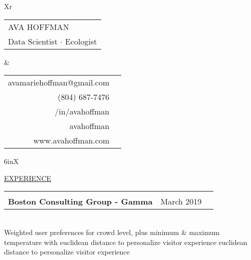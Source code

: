 \documentclass[fontsize=10pt]{scrlttr2}
\begin{document}

\begin{tabularx}{\textwidth}{Xr}
    \begin{tabular}{l}
        \Huge AVA HOFFMAN \\
        \large Data Scientist $\cdot$ Ecologist \\
    \end{tabular}
    & 
    \begin{tabular}{rc}
        \footnotesize avamariehoffman@gmail.com & {\faEnvelopeO} \\
        \footnotesize (804) 687-7476 & {\faMobile} \\
        \footnotesize /in/avahoffman & {\faLinkedin} \\
        \footnotesize avahoffman & {\faGithub} \\
        \footnotesize www.avahoffman.com & {\faGlobe} \\
    \end{tabular}
\end{tabularx}
\vspace{0.5cm}

\newcommand{\experienceboxsize}{6in}

\begin{tabularx}{\experienceboxsize}{X}

    \Large\underline{EXPERIENCE} \\
    
    {\begin{tabularx}{\experienceboxsize}{lXr}
	{\faEnvelopeO} 
        & 
         \begin{tabular}{ll}
                \small \textbf{Data Scientist} \\
                \small \textbf{Boston Consulting Group - Gamma}
         \end{tabular}
        &
         \footnotesize March 2019 \\
    
    \end{tabularx}} \\
    
    \footnotesize Weighted user preferences for crowd level, plus minimum \& maximum 
    temperature with euclidean distance to personalize visitor experience euclidean distance to personalize visitor experience 
    
    
\end{tabularx}
\end{document}
